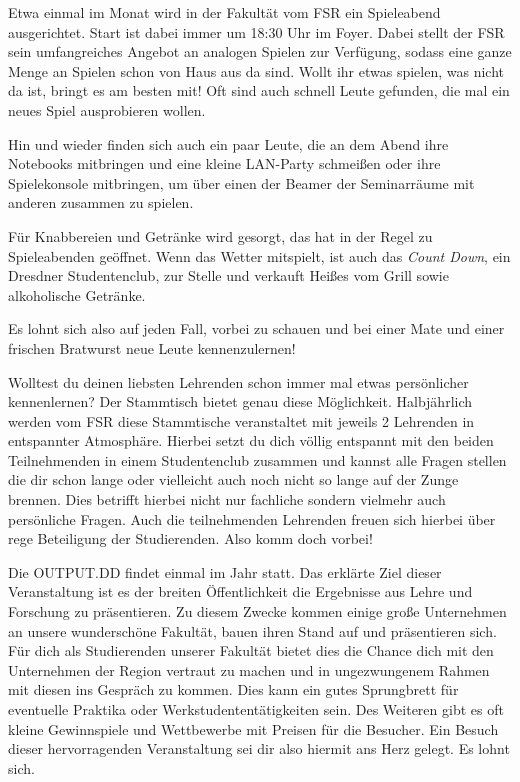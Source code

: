 

Etwa einmal im Monat wird in der Fakultät vom FSR ein Spieleabend ausgerichtet. Start ist dabei immer um 18:30 Uhr im Foyer. Dabei stellt der FSR sein umfangreiches Angebot an analogen Spielen zur Verfügung, sodass eine ganze Menge an Spielen schon von Haus aus da sind. Wollt ihr etwas spielen, was nicht da ist, bringt es am besten mit! Oft sind auch schnell Leute gefunden, die mal ein neues Spiel ausprobieren wollen.

Hin und wieder finden sich auch ein paar Leute, die an dem Abend ihre Notebooks mitbringen und eine kleine LAN-Party schmeißen oder ihre Spielekonsole mitbringen, um über einen der Beamer der Seminarräume mit anderen zusammen zu spielen.

Für Knabbereien und Getränke wird gesorgt, das \ascii{} hat in der Regel zu Spieleabenden geöffnet. Wenn das Wetter mitspielt, ist auch das \emph{Count Down}, ein Dresdner Studentenclub, zur Stelle und verkauft Heißes vom Grill sowie alkoholische Getränke.

Es lohnt sich also auf jeden Fall, vorbei zu schauen und bei einer Mate und einer frischen Bratwurst neue Leute kennenzulernen!


Wolltest du deinen liebsten Lehrenden schon immer mal etwas persönlicher kennenlernen? Der Stammtisch bietet genau diese Möglichkeit. Halbjährlich werden vom FSR diese Stammtische veranstaltet mit jeweils 2 Lehrenden in entspannter Atmosphäre. Hierbei setzt du dich völlig entspannt mit den beiden Teilnehmenden in einem Studentenclub zusammen und kannst alle Fragen stellen die dir schon lange oder vielleicht auch noch nicht so lange auf der Zunge brennen. Dies betrifft hierbei nicht nur fachliche sondern vielmehr auch persönliche Fragen. Auch die teilnehmenden Lehrenden freuen sich hierbei über rege Beteiligung der Studierenden. Also komm doch vorbei!


Die OUTPUT.DD findet einmal im Jahr statt. Das erklärte Ziel dieser Veranstaltung ist es der breiten Öffentlichkeit die Ergebnisse aus Lehre und Forschung zu präsentieren. Zu diesem Zwecke kommen einige große Unternehmen an unsere wunderschöne Fakultät, bauen ihren Stand auf und präsentieren sich. Für dich als Studierenden unserer Fakultät bietet dies die Chance dich mit den Unternehmen der Region vertraut zu machen und in ungezwungenem Rahmen mit diesen ins Gespräch zu kommen. Dies kann ein gutes Sprungbrett für eventuelle Praktika oder Werkstudententätigkeiten sein. Des Weiteren gibt es oft kleine Gewinnspiele und Wettbewerbe mit Preisen für die Besucher. Ein Besuch dieser hervorragenden Veranstaltung sei dir also hiermit ans Herz gelegt. Es lohnt sich.

